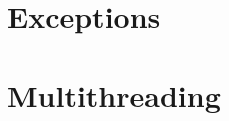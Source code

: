 \documentclass[a4paper]{report}
\begin{document}
\section{Exceptions}
\section{Multithreading}

\end{document}

